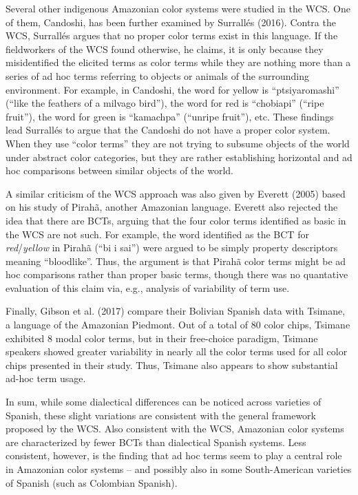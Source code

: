 \documentclass[
  english,
  ,man,floatsintext]{apa6}
\begin{document}
Several other indigenous Amazonian color systems were studied in the WCS. One of them, Candoshi, has been further examined by Surrallés (2016). Contra the WCS, Surrallés argues that no proper color terms exist in this language. If the fieldworkers of the WCS found otherwise, he claims, it is only because they misidentified the elicited terms as color terms while they are nothing more than a series of ad hoc terms referring to objects or animals of the surrounding environment. For example, in Candoshi, the word for yellow is \enquote{ptsiyaromashi} (\enquote{like the feathers of a milvago bird}), the word for red is \enquote{chobiapi} (\enquote{ripe fruit}), the word for green is \enquote{kamachpa} (\enquote{unripe fruit}), etc. These findings lead Surrallés to argue that the Candoshi do not have a proper color system. When they use \enquote{color terms} they are not trying to subsume objects of the world under abstract color categories, but they are rather establishing horizontal and ad hoc comparisons between similar objects of the world.

A similar criticism of the WCS approach was also given by Everett (2005) based on his study of Pirahã, another Amazonian language. Everett also rejected the idea that there are BCTs, arguing that the four color terms identified as basic in the WCS are not such. For example, the word identified as the BCT for \emph{red}/\emph{yellow} in Pirahã (\enquote{bi i sai}) were argued to be simply property descriptors meaning \enquote{bloodlike}. Thus, the argument is that Pirahã color terms might be ad hoc comparisons rather than proper basic terms, though there was no quantative evaluation of this claim via, e.g., analysis of variability of term use.

Finally, Gibson et al. (2017) compare their Bolivian Spanish data with Tsimane, a language of the Amazonian Piedmont. Out of a total of 80 color chips, Tsimane exhibited 8 modal color terms, but in their free-choice paradigm, Tsimane speakers showed greater variability in nearly all the color terms used for all color chips presented in their study. Thus, Tsimane also appears to show substantial ad-hoc term usage.

In sum, while some dialectical differences can be noticed across varieties of Spanish, these slight variations are consistent with the general framework proposed by the WCS. Also consistent with the WCS, Amazonian color systems are characterized by fewer BCTs than dialectical Spanish systems. Less consistent, however, is the finding that ad hoc terms seem to play a central role in Amazonian color systems -- and possibly also in some South-American varieties of Spanish (such as Colombian Spanish).
\end{document}
